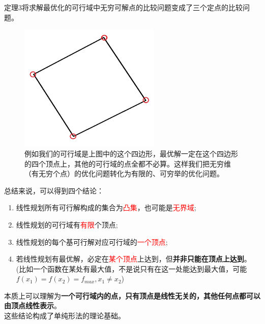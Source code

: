         定理3将求解最优化的可行域中无穷可解点的比较问题变成了三个定点的比较问题。
        \begin{figure}[H]
            \centering
            \includegraphics[width=0.6\textwidth]{./image/4.png}
            \caption{例如我们的可行域是上图中的这个四边形，最优解一定在这个四边形的四个顶点上，其他的可行域的点全都不必算。这样我们把无穷维（有无穷个点）的优化问题转化为有限的、可穷举的优化问题。}
            \label{fig:Chapter2_Temporary_Pavilion_4}
        \end{figure}
        总结来说，可以得到四个结论：
        \begin{enumerate}
            \item 线性规划所有可行解构成的集合为\textcolor{red}{凸集}，也可能是\textcolor{red}{无界域};
            \item 线性规划的可行域有\textcolor{red}{有限}个顶点;
            \item 线性规划的每个基可行解对应可行域的\textcolor{red}{一个顶点};
            \item 若线性规划有最优解，必定在\textcolor{red}{某个顶点}上达到，但\textbf{并非只能在顶点上达到}。\\
            (比如一个函数在某处有最大值，不是说只有在这一处能达到最大值，可能$f(x_1)=f(x_2)=f_{max},x_1\neq x_2$)
        \end{enumerate}
        本质上可以理解为\textbf{一个可行域内的点，只有顶点是线性无关的，其他任何点都可以由顶点线性表示}。\\
        这些结论构成了单纯形法的理论基础。
